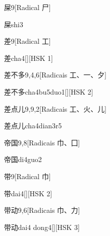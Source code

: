 \begin{entry}{屎}{9}[Radical ⼫]
  \begin{phonetics}{屎}{shi3}
  \end{phonetics}
\end{entry}

\begin{entry}{差}{9}[Radical ⼯]
  \begin{phonetics}{差}{cha4}[][HSK 1]
  \end{phonetics}
\end{entry}

\begin{entry}{差不多}{9,4,6}[Radicais ⼯、⼀、⼣]
  \begin{phonetics}{差不多}{cha4bu5duo1}[][HSK 2]
  \end{phonetics}
\end{entry}

\begin{entry}{差点儿}{9,9,2}[Radicais ⼯、⽕、⼉]
  \begin{phonetics}{差点儿}{cha4dian3r5}
  \end{phonetics}
\end{entry}

\begin{entry}{帝国}{9,8}[Radicais ⼱、⼞]
  \begin{phonetics}{帝国}{di4guo2}
  \end{phonetics}
\end{entry}

\begin{entry}{带}{9}[Radical ⼱]
  \begin{phonetics}{带}{dai4}[][HSK 2]
  \end{phonetics}
\end{entry}

\begin{entry}{带动}{9,6}[Radicais ⼱、⼒]
  \begin{phonetics}{带动}{dai4 dong4}[][HSK 3]
  \end{phonetics}
\end{entry}

